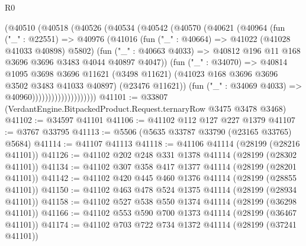 \begin{lexlean}{R0}
\begin{coremodule}
                        (@40510
                          (@40518
                            (@40526
                              (@40534
                                (@40542
                                  (@40570
                                    (@40621
                                      (@40964
                                        (fun ("_" : @22551) =>
                                        @40976
                                          (@41016
                                            (fun ("_" : @40664) =>
                                            @41022 (@41028 @41033 @40898) @5802)
                                            (fun ("_" : @40663 @4033) =>
                                            @40812
                                              @196
                                              @11
                                              @168
                                              @3696
                                              @3696
                                              @3483
                                              @4044
                                              @40897
                                              @4047))
                                          (fun ("_" : @34070) =>
                                          @40814
                                            @1095
                                            @3698
                                            @3696
                                            @11621
                                            (@3498 @11621)
                                            (@41023 @168 @3696 @3696 @3502 @3483 @41033 @40897)
                                            (@23476 @11621))
                                          (fun ("_" : @34069 @4033) => @40960))))))))))))))))))))
@41101 := @33807 (VerdantEngine.BitpackedProduct.Request.ternaryRow @3475 @3478 @3468)
@41102 := @34597 @41101
@41106 := @41102 @112 @127 @227 @1379
@41107 := @3767 @33795
@41113 := @5506 (@5635 @33787 @33790 (@23165 @33765) @5684)
@41114 := @41107 @41113
@41118 := @41106 @41114 (@28199 (@28216 @41101))
@41126 := @41102 @202 @248 @331 @1378 @41114 (@28199 (@28302 @41101))
@41134 := @41102 @307 @358 @417 @1377 @41114 (@28199 (@28201 @41101))
@41142 := @41102 @420 @445 @460 @1376 @41114 (@28199 (@28855 @41101))
@41150 := @41102 @463 @478 @524 @1375 @41114 (@28199 (@28934 @41101))
@41158 := @41102 @527 @538 @550 @1374 @41114 (@28199 (@36298 @41101))
@41166 := @41102 @553 @590 @700 @1373 @41114 (@28199 (@36467 @41101))
@41174 := @41102 @703 @722 @734 @1372 @41114 (@28199 (@37241 @41101))

\end{coremodule}
\end{lexlean}
